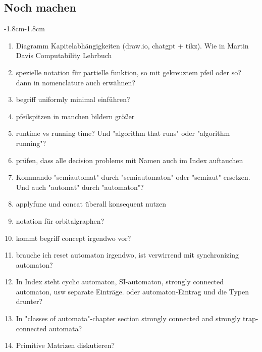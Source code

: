 \subsection{Noch machen}


\begin{adjustwidth}{-1.8cm}{-1.8cm}

\footnotesize 
	\begin{enumerate}[itemsep=-5pt]
	\item Diagramm Kapitelabhängigkeiten (draw.io, chatgpt + tikz). Wie in Martin Davis Computability Lehrbuch
		
	\item spezielle notation für partielle funktion, so mit gekreuztem pfeil oder so? dann in nomenclature auch erwähnen? 
	
	\item  begriff uniformly minimal einführen?
	
	\item  pfeilspitzen in manchen bildern größer
	
	\item runtime vs running time? Und "algorithm that runs" oder "algorithm running"?
	
	\item  prüfen, dass alle decision problems mit Namen auch im Index auftauchen
	
	\item Kommando "semiautomat" durch "semiautomaton" oder "semiaut" ersetzen. Und auch "automat" durch "automaton"?
	
	\item applyfunc und concat überall konsequent nutzen
	
	\item notation für orbitalgraphen?
	
	\item kommt begriff concept irgendwo vor?
	
	\item brauche ich reset automaton irgendwo, ist verwirrend mit synchronizing automaton?	
	
	\item In Index steht cyclic automaton, SI-automaton, strongly connected automaton, usw separate Einträge. oder automaton-Eintrag und die Typen drunter?	
	
	\item In "classes of automata"-chapter section strongly connected and strongly trap-connected automata?    
		
	\item Primitive Matrizen diskutieren?
		

\end{enumerate}
\end{adjustwidth}
